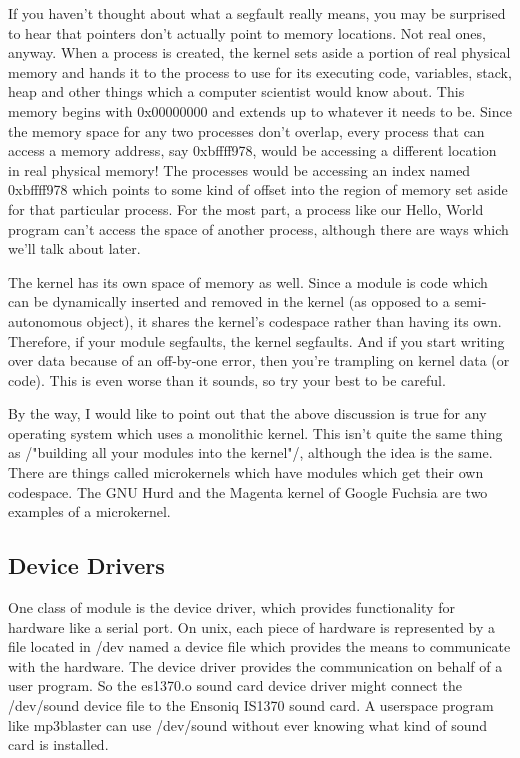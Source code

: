\documentclass[11pt]{article}
\begin{document}
If you haven't thought about what a segfault really means, you may be surprised to hear that pointers don't actually point to memory locations. Not real ones, anyway. When a process is created, the kernel sets aside a portion of real physical memory and hands it to the process to use for its executing code, variables, stack, heap and other things which a computer scientist would know about. This memory begins with 0x00000000 and extends up to whatever it needs to be. Since the memory space for any two processes don't overlap, every process that can access a memory address, say 0xbffff978, would be accessing a different location in real physical memory! The processes would be accessing an index named 0xbffff978 which points to some kind of offset into the region of memory set aside for that particular process. For the most part, a process like our Hello, World program can't access the space of another process, although there are ways which we'll talk about later.

The kernel has its own space of memory as well. Since a module is code which can be dynamically inserted and removed in the kernel (as opposed to a semi-autonomous object), it shares the kernel's codespace rather than having its own. Therefore, if your module segfaults, the kernel segfaults. And if you start writing over data because of an off-by-one error, then you're trampling on kernel data (or code). This is even worse than it sounds, so try your best to be careful.

By the way, I would like to point out that the above discussion is true for any operating system which uses a monolithic kernel. This isn't quite the same thing as /"building all your modules into the kernel"/, although the idea is the same. There are things called microkernels which have modules which get their own codespace. The GNU Hurd and the Magenta kernel of Google Fuchsia are two examples of a microkernel.

\subsection*{Device Drivers}
\label{sec-5-6}
One class of module is the device driver, which provides functionality for hardware like a serial port. On unix, each piece of hardware is represented by a file located in /dev named a device file which provides the means to communicate with the hardware. The device driver provides the communication on behalf of a user program. So the es1370.o sound card device driver might connect the /dev/sound device file to the Ensoniq IS1370 sound card. A userspace program like mp3blaster can use /dev/sound without ever knowing what kind of sound card is installed.
\end{document}
